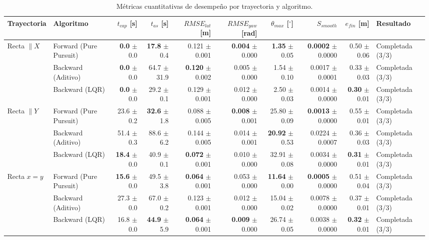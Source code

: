 \begin{table}[htbp]
\centering
\small
\caption{Métricas cuantitativas de desempeño por trayectoria y algoritmo.}
\label{tab:metricas_cap5}
\begin{tabular}{llrrrrrrrl}
\toprule
Trayectoria & Algoritmo & $t_{cap}$ [s] & $t_{as}$ [s] & $RMSE_{lat}$ [m] & $RMSE_{yaw}$ [rad] & $\theta_{max}$ [$^\circ$] & $S_{smooth}$ & $e_{fin}$ [m] & Resultado \\
\midrule
Recta $\parallel X$ & Forward (Pure Pursuit) & \textbf{0.0} $\pm$ 0.0 & \textbf{17.8} $\pm$ 0.4 & 0.121 $\pm$ 0.001 & \textbf{0.004} $\pm$ 0.000 & \textbf{1.35} $\pm$ 0.05 & \textbf{0.0002} $\pm$ 0.0000 & 0.50 $\pm$ 0.06 & Completada (3/3) \\
 & Backward (Aditivo) & \textbf{0.0} $\pm$ 0.0 & 64.7 $\pm$ 31.9 & \textbf{0.120} $\pm$ 0.002 & 0.005 $\pm$ 0.000 & 1.54 $\pm$ 0.10 & 0.0017 $\pm$ 0.0001 & 0.33 $\pm$ 0.03 & Completada (3/3) \\
 & Backward (LQR) & \textbf{0.0} $\pm$ 0.0 & 29.2 $\pm$ 0.1 & 0.129 $\pm$ 0.001 & 0.012 $\pm$ 0.000 & 2.50 $\pm$ 0.03 & 0.0014 $\pm$ 0.0000 & \textbf{0.30} $\pm$ 0.01 & Completada (3/3) \\
\midrule
Recta $\parallel Y$ & Forward (Pure Pursuit) & 23.6 $\pm$ 0.2 & \textbf{32.6} $\pm$ 1.8 & 0.088 $\pm$ 0.005 & \textbf{0.008} $\pm$ 0.001 & 25.80 $\pm$ 0.09 & \textbf{0.0013} $\pm$ 0.0000 & 0.55 $\pm$ 0.01 & Completada (3/3) \\
 & Backward (Aditivo) & 51.4 $\pm$ 0.3 & 88.6 $\pm$ 6.2 & 0.144 $\pm$ 0.005 & 0.014 $\pm$ 0.001 & \textbf{20.92} $\pm$ 0.53 & 0.0224 $\pm$ 0.0007 & 0.36 $\pm$ 0.03 & Completada (3/3) \\
 & Backward (LQR) & \textbf{18.4} $\pm$ 0.0 & 40.9 $\pm$ 0.1 & \textbf{0.072} $\pm$ 0.001 & 0.010 $\pm$ 0.000 & 32.91 $\pm$ 0.08 & 0.0034 $\pm$ 0.0000 & \textbf{0.31} $\pm$ 0.01 & Completada (3/3) \\
\midrule
Recta $x = y$ & Forward (Pure Pursuit) & \textbf{15.6} $\pm$ 0.0 & 49.5 $\pm$ 3.8 & \textbf{0.064} $\pm$ 0.001 & 0.053 $\pm$ 0.000 & \textbf{11.64} $\pm$ 0.00 & \textbf{0.0005} $\pm$ 0.0000 & 0.51 $\pm$ 0.04 & Completada (3/3) \\
 & Backward (Aditivo) & 27.3 $\pm$ 0.0 & 67.0 $\pm$ 0.2 & 0.123 $\pm$ 0.001 & 0.012 $\pm$ 0.000 & 15.04 $\pm$ 0.02 & 0.0078 $\pm$ 0.0000 & 0.37 $\pm$ 0.01 & Completada (3/3) \\
 & Backward (LQR) & 16.8 $\pm$ 0.0 & \textbf{44.9} $\pm$ 5.9 & \textbf{0.064} $\pm$ 0.001 & \textbf{0.009} $\pm$ 0.000 & 26.74 $\pm$ 0.05 & 0.0038 $\pm$ 0.0000 & \textbf{0.32} $\pm$ 0.01 & Completada (3/3) \\

\end{tabular}
\end{table}
